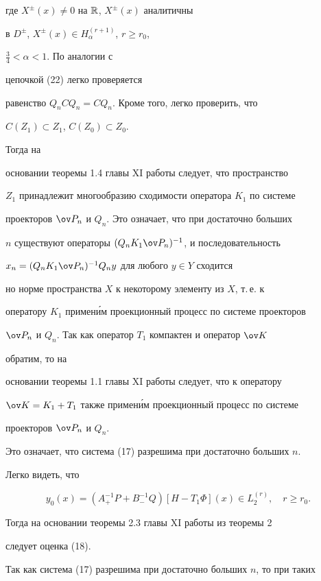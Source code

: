 \begin{pf}
где $X^\pm(x)\ne 0$ на $\Bbb R$, $X^\pm(x)$ аналитичны 


в $D^\pm$, $X^\pm(x)\in H^{(r+1)}_\alpha$, $r\ge r_0$, 


$\frac{3}{4}<\alpha< 1$. По аналогии с 


цепочкой (22) легко проверяется 


равенство $Q_n CQ_n=CQ_n$. Кроме того, легко проверить, что 


$C(Z_1)\subset Z_1$, $C(Z_0)\subset Z_0$. 


Тогда на 


основании теоремы 1.4 главы XI работы \cite{8} следует, что пространство 


$Z_1$ принадлежит многообразию сходимости оператора $K_1$ по системе 


проекторов $\ov P_n$ и $Q_n$. Это означает, что при достаточно больших 


$n$ существуют операторы $(Q_n K_1\ov P_n)^{-1}$, и последовательность 


$x_n=(Q_n K_1\ov P_n)^{-1}Q_n y$ для любого $y\in Y$ сходится 


но норме пространства $X$ к некоторому элементу из $X$, т.\,е. к 


оператору $K_1$ примен\'им проекционный процесс по системе проекторов 


$\ov P_n$ и $Q_n$. Так как оператор $T_1$ компактен и оператор $\ov K$ 


обратим, то на 


основании теоремы 1.1 главы XI работы \cite{8} следует, что к оператору 


$\ov K=K_1+T_1$ также примен\'им проекционный процесс по системе 


проекторов $\ov P_n$ и $Q_n$. 


Это означает, что система (17) разрешима при достаточно больших $n$. 


Легко видеть, что 


$$ 


y_0(x)=(A^{-1}_+P+B^{-1}_-Q)[H-T_1\Phi](x)\in L^{(r)}_2,\quad r\ge r_0. 


$$ 


Тогда на основании теоремы 2.3 главы XI работы \cite{8} из теоремы 2 


следует оценка (18). 


\end{pf} 


 


Так как система (17) разрешима при достаточно больших $n$, то при таких 


